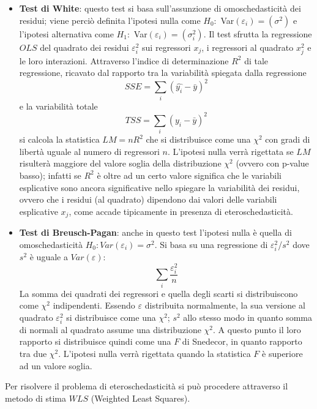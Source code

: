 \documentclass[a4page, 11pt]{article} %
\begin{document}
\begin{itemize}
\item \textbf{Test di White}: questo test si basa sull’assunzione di omoschedasticità dei residui; viene perciò definita l’ipotesi nulla come $H_0:$ Var$(\varepsilon_i) = (\sigma^2)$ e l’ipotesi alternativa come $H_1:$ Var$(\varepsilon_i ) = ( \sigma^2_i )$.
Il test sfrutta la regressione $OLS$ del quadrato dei residui $\varepsilon_i^2$ sui regressori $x_j$, i regressori al quadrato $x_j^2$ e le loro interazioni.
Attraverso l'indice di determinazione $R^{2}$ di tale regressione, ricavato dal rapporto tra la variabilità spiegata dalla regressione 
\[
SSE = \sum_{i}(\hat{y_i} - \bar{y})^2
\]
 e la variabilità totale 
\[ 
TSS = \sum_{i} (y_i - \bar{y})^2
\]
si calcola la statistica $LM=n R^{2}$ che si distribuisce come una $\chi^{2}$ con gradi di libertà uguale al numero di regressori $n$. L’ipotesi nulla verrà rigettata se $LM$ risulterà maggiore del valore soglia della distribuzione $\chi^{2}$ (ovvero con p-value basso); %
infatti se $R^{2}$ è oltre ad un certo valore significa che le variabili esplicative sono ancora significative nello spiegare la variabilità dei residui, ovvero che i residui (al quadrato) dipendono dai valori delle variabili esplicative $x_j$, come accade tipicamente in presenza di eteroschedasticità.

\item \textbf{Test di Breusch-Pagan}: anche in questo test l’ipotesi nulla è quella di omoschedasticità $H_0: Var(\varepsilon_i) = \sigma^2$.
Si basa su una regressione di $\varepsilon^{2}_i$/$s^{2}$ dove $s^{2}$ è uguale a $Var(\varepsilon)$:
\[
\sum_{i}\frac{\varepsilon_i^2}{n}
\] 
La somma dei quadrati dei regressori e quella degli scarti si distribuiscono come $\chi^{2}$ indipendenti. Essendo $\varepsilon$ distribuita normalmente, la sua versione al quadrato $\varepsilon_i^2$ si distribuisce come una $\chi^2$; $s^2$ allo stesso modo in quanto somma di normali al quadrato assume una distribuzione $\chi^2$. A questo punto il loro rapporto si distribuisce quindi come una $F$ di Snedecor, in quanto rapporto tra due $\chi^2$. L’ipotesi nulla verrà rigettata quando la statistica $F$ è superiore ad un valore soglia.
\end{itemize}
Per risolvere il problema di eteroschedasticità si può procedere attraverso il metodo di stima $WLS$ (Weighted Least Squares).
\end{document}
